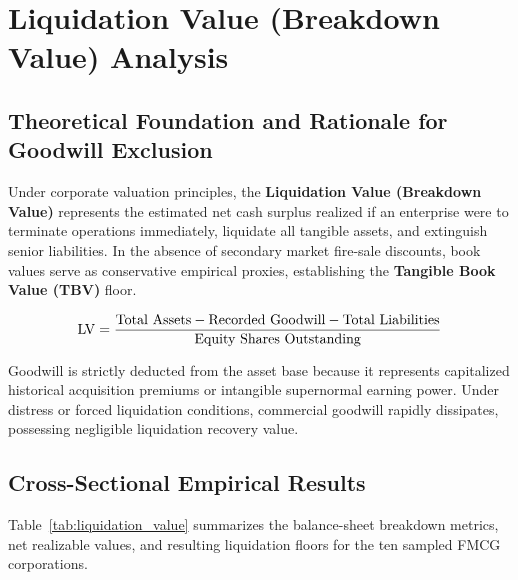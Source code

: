 
\clearpage
\section[Liquidation Value Analysis]{Liquidation Value (Breakdown Value) Analysis}

\subsection{Theoretical Foundation and Rationale for Goodwill Exclusion}
Under corporate valuation principles, the \textbf{Liquidation Value (Breakdown Value)} represents the estimated net cash surplus realized if an enterprise were to terminate operations immediately, liquidate all tangible assets, and extinguish senior liabilities. In the absence of secondary market fire-sale discounts, book values serve as conservative empirical proxies, establishing the \textbf{Tangible Book Value (TBV)} floor.

\begin{formulabox}
\begin{equation}
    \operatorname{LV} = \frac{\text{Total Assets} - \text{Recorded Goodwill} - \text{Total Liabilities}}{\text{Equity Shares Outstanding}}
\end{equation}
\end{formulabox}

Goodwill is strictly deducted from the asset base because it represents capitalized historical acquisition premiums or intangible supernormal earning power. Under distress or forced liquidation conditions, commercial goodwill rapidly dissipates, possessing negligible liquidation recovery value.

\subsection{Cross-Sectional Empirical Results}
Table~\ref{tab:liquidation_value} summarizes the balance-sheet breakdown metrics, net realizable values, and resulting liquidation floors for the ten sampled FMCG corporations.

